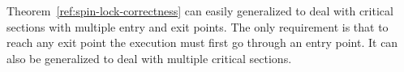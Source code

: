 \documentclass{article}[10pt]
\begin{document}
Theorem~\ref{ref:spin-lock-correctness} can easily generalized to deal
with critical sections with multiple entry and exit points. The only
requirement is that to reach any exit point the execution must first
go through an entry point. It can also be generalized to deal with
multiple critical sections.
\end{document}
